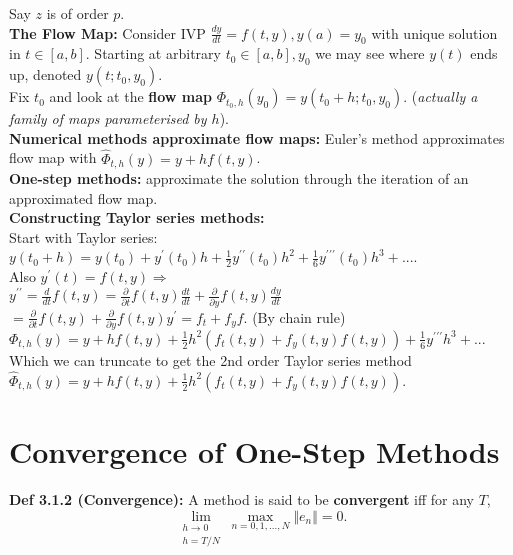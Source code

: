 \documentclass[10pt,a4paper]{article}
\renewcommand{\implies}{\Rightarrow}
\newcommand{\del}{\partial}
\begin{document}
\begin{multicols*}{2}
Say $z$ is of order $p$.\\
\textbf{The Flow Map:} Consider IVP $\frac{dy}{dt} = f(t,y), y(a) = y_0$ with unique solution in $t \in [a,b]$. Starting at arbitrary $t_0 \in [a,b], y_0$ we may see where $y(t)$ ends up, denoted $y(t;t_0, y_0)$. \\
Fix $t_0$ and look at the \textbf{flow map} $\boxed{\Phi_{t_0, h}(y_0) = y(t_0 + h;t_0, y_0)}$.
(\textit{actually a family of maps parameterised by $h$}).\\
\textbf{Numerical methods approximate flow maps:} Euler's method approximates flow map with $\hat{\Phi}_{t, h}(y) = y + hf(t,y)$.\\
\textbf{One-step methods:} approximate the solution through the iteration of an approximated flow map.\\
\textbf{Constructing Taylor series methods:} \\
Start with Taylor series:\\
$y(t_0 + h) = y(t_0) + y^\prime(t_0)h + \frac{1}{2}y^{\prime\prime}(t_0)h^2 + \frac{1}{6}y^{\prime\prime\prime}(t_0)h^3 + ...$. \\
Also $y^\prime(t) = f(t, y) \implies$ \\
$y^{\prime\prime} = \frac{d}{dt}f(t,y) = \frac{\del}{\del t} f(t,y)\frac{dt}{dt} + \frac{\del}{\del y} f(t,y)\frac{dy}{dt}$\\
$ = \frac{\del}{\del t} f(t,y) + \frac{\del}{\del y} f(t,y)y^\prime = f_t + f_y f$. (By chain rule)\\
$\Phi_{t,h}(y) = y + hf(t,y) + \frac{1}{2}h^2(f_t(t,y) + f_y(t,y)f(t,y)) + \frac{1}{6}y^{\prime\prime\prime}h^3 + ...$ \\
Which we can truncate to get the 2nd order Taylor series method\\
$\boxed{\hat{\Phi}_{t,h}(y) = y + hf(t,y) + \frac{1}{2}h^2(f_t(t,y) + f_y(t,y)f(t,y))}$.\\


\section{Convergence of One-Step Methods}

\textbf{Def 3.1.2 (Convergence):} A method is said to be \textbf{convergent} iff for any $T$, \[\lim_{\begin{smallmatrix}
    h \to 0 \\ h = T/N
\end{smallmatrix}} \max_{n = 0,1,...,N}{\Vert e_n \Vert} = 0.\]


\end{multicols*}
\end{document}
